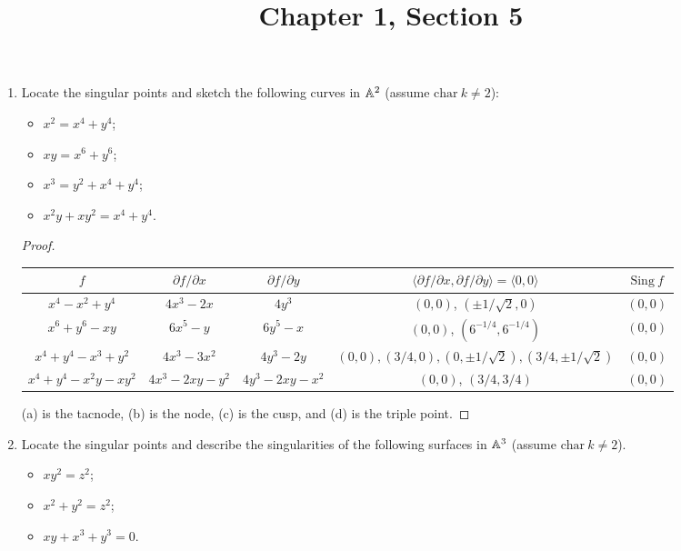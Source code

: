 \documentclass{article}
\title{Chapter 1, Section 5}
\begin{document}
\maketitle
\begin{enumerate} [label=\textbf{\arabic*.}, leftmargin=0cm]

\item[\textbf{1.}] Locate the singular points and sketch the following curves in $\mathbb{A}^2$ (assume $\text{char}~k \neq 2$):
\begin{itemize}
    \item[(a)] $x^2 = x^4 + y^4$;
    \item[(b)] $xy = x^6 + y^6$;
    \item[(c)] $x^3 = y^2 + x^4 + y^4$;
    \item[(d)] $x^2y + xy^2 = x^4 + y^4$.
\end{itemize}

\begin{proof} $ $ \vspace{0pt}
    \begin{center}
        \renewcommand{\arraystretch}{1.5}
        \begin{tabular}{c|c|c|c|c}
             $f$ & $\partial f / \partial x$ & $\partial f / \partial y$ & $\langle \partial f / \partial x, \partial f / \partial y\rangle = \langle 0, 0\rangle$ & $\text{Sing}~f$ \\ \hline
            $x^4 - x^2 + y^4$ & $4x^3 - 2x$ & $4y^3$ & $(0, 0)$, $(\pm 1/\sqrt{2}, 0)$ & $(0, 0)$ \\ \hline
            $x^6 + y^6 - xy$ & $6x^5 - y$ & $6y^5 - x$ & $(0, 0)$, $(6^{-1/4}, 6^{-1/4})$ & $(0, 0)$ \\ \hline
            $x^4 + y^4 - x^3 + y^2$ & $4x^3 - 3x^2$ & $4y^3 - 2y$ & $(0, 0), (3/4, 0), (0, \pm 1 / \sqrt{2}), (3/4, \pm 1 / \sqrt{2})$ & $(0, 0)$ \\ \hline
            $x^4 + y^4 - x^2 y - xy^2$ & $4x^3 - 2xy - y^2$ & $4y^3 - 2xy - x^2$ & $(0, 0)$, $(3/4, 3/4)$ & $(0, 0)$
        \end{tabular}
    \end{center}
    (a) is the tacnode, (b) is the node, (c) is the cusp, and (d) is the triple point.
\end{proof}

\item[\textbf{2.}] Locate the singular points and describe the singularities of the following surfaces in $\mathbb{A}^3$ (assume $\text{char}~k \neq 2$).
\begin{itemize}
    \item[(a)] $xy^2 = z^2$;
    \item[(b)] $x^2 + y^2 = z^2$;
    \item[(c)] $xy + x^3 + y^3 = 0$.
\end{itemize}


\end{enumerate}
\end{document}
